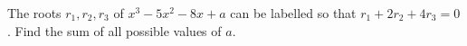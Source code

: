 The roots $r_1,r_2,r_3$ of $x^3-5x^2-8x+a$ can be labelled so that $r_1+2r_2+4r_3=0$. Find the sum of all possible values of $a$.
